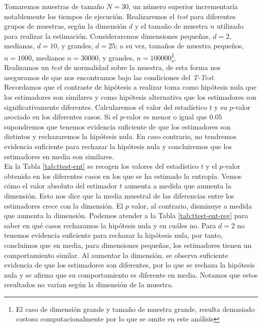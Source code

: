 \documentclass[12pt,a4paper]{report} %
\theoremstyle{definition}
\begin{document}
Tomaremos muestras de tamaño $N=30$, un número superior incrementaría notablemente los tiempos de ejecución. Realizaremos el \textit{test} para diferentes grupos de muestras, según la dimensión $d$ y el tamaño de muestra $n$ utilizado para realizar la estimación. Consideraremos dimensiones pequeñas, $d=2$, medianas, $d=10$, y grandes, $d=25$; a su vez, tamaños de muestra pequeños, $n=1000$, medianos $n=30000$, y grandes, $n=100000$\footnote{El caso de dimensión grande y tamaño de muestra grande, resulta demasiado costoso computacionalmente por lo que se omite en este análisis}.\\

Realizamos un \textit{test} de normalidad sobre la muestra, de esta forma nos aseguramos de que nos encontramos bajo las condiciones del \textit{T-Test}.\\

Recordamos que el contraste de hipótesis a realizar toma como hipótesis nula que los estimadores son similares y como hipótesis alternativa que los estimadores son significativamente diferentes. Calcularemos el valor del estadístico $t$ y su $p$-valor asociado en los diferentes casos. Si el $p$-valor es menor o igual que $0.05$ supondremos que tenemos evidencia suficiente de que los estimadores son distintos y rechazaremos la hipótesis nula. En caso contrario, no tendremos evidencia suficiente para rechazar la hipótesis nula y concluiremos que los estimadores en media son similares.\\

En la Tabla \ref{tab:ttest-ent} se recogen los valores del estadístico $t$ y el $p$-valor obtenido en los diferentes casos en los que se ha estimado la entropía. Vemos cómo el valor absoluto del estimador $t$ aumenta a medida que aumenta la dimensión. Esto nos dice que la media muestral de las diferencias entre los estimadores crece con la dimensión. El $p$ valor, al contrario, disminuye a medida que aumenta la dimensión. Podemos atender a la Tabla \ref{tab:ttest-ent-reg} para saber en qué casos rechazamos la hipótesis nula y en cuáles no. Para $d=2$ no tenemos evidencia suficiente para rechazar la hipótesis nula, por tanto, concluimos que en media, para dimensiones pequeñas, los estimadores tienen un comportamiento similar. Al aumentar la dimensión, se observa suficiente evidencia de que los estimadores son diferentes, por lo que se rechaza la hipótesis nula y se afirma que su comportamiento es diferente en media. Notamos que estos resultados no varían según la dimensión de la muestra.\\
\end{document}
